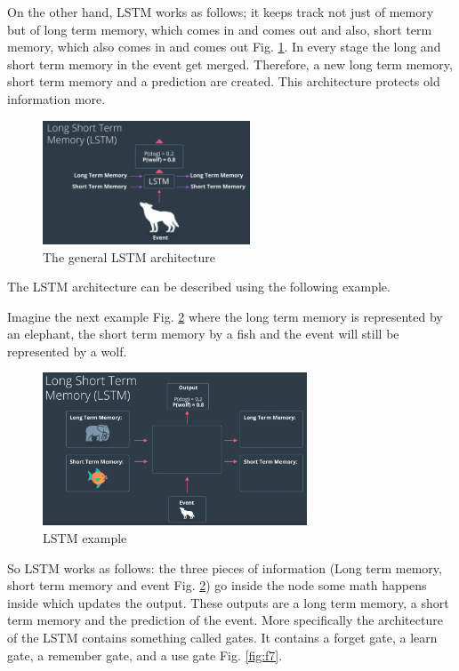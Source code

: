 \documentclass{article}
\begin{document}
On the other hand, LSTM works as follows; it keeps track not just of memory but of long term memory, which comes in and comes out and also, short term memory, which also comes in and comes out Fig. \ref{fig:f5}. In every stage the long and short term memory in the event get merged. Therefore, a new long term memory, short term memory and a prediction are created. This architecture protects old information more.

\begin{figure}[ht]
    \centering
    \includegraphics[width=0.55\textwidth,height=0.55\textheight,keepaspectratio]{images/lstm.png}
    \captionsetup{justification=centering}
    \caption{The general LSTM architecture}
    \label{fig:f5}
\end{figure}

The LSTM architecture can be described using the following example. 

Imagine the next example Fig. \ref{fig:f6} where the long term memory is represented by an elephant, the short term memory by a fish and the event will still be represented by a wolf.

\begin{figure}[ht]
    \centering
    \includegraphics[width=0.7\textwidth,height=0.7\textheight,keepaspectratio]{images/lstm_example.png}
    \captionsetup{justification=centering}
    \caption{LSTM example}
    \label{fig:f6}
\end{figure}

So LSTM works as follows: the three pieces of information (Long term memory, short term memory and event Fig. \ref{fig:f6}) go inside the node some math happens inside which updates the output. These outputs are a long term memory, a short term memory and the prediction of the event. More specifically the architecture of the LSTM contains something called gates. It contains a forget gate, a learn gate, a remember gate, and a use gate Fig. \ref{fig:f7}.
\end{document}
